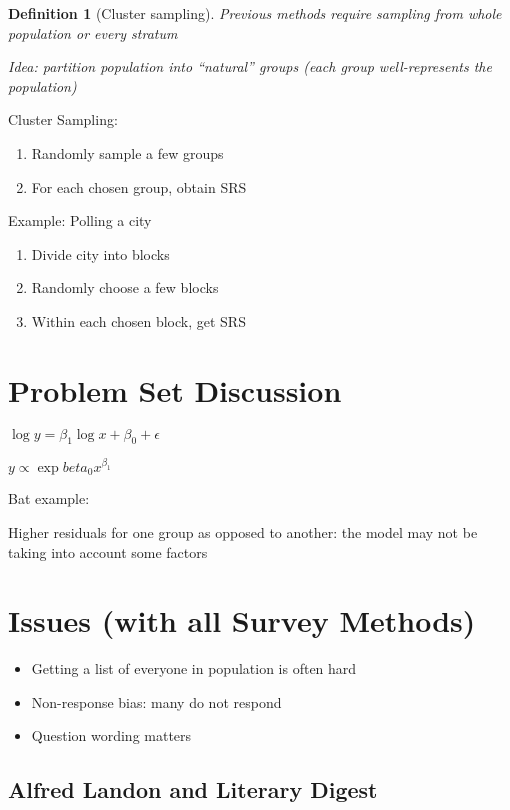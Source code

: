 \documentclass[twoside]{article}
\newtheorem{definition}[theorem]{Definition}
\begin{document}
\begin{definition}[Cluster sampling] 

Previous methods require sampling from whole population or every stratum

Idea: partition population into ``natural'' groups (each group well-represents the population)

\end{definition}

Cluster Sampling:

\begin{enumerate}
\item Randomly sample a few groups
\item For each chosen group, obtain SRS
\end{enumerate}

Example: Polling a city

\begin{enumerate}
\item Divide city into blocks
\item Randomly choose a few blocks
\item Within each chosen block, get SRS
\end{enumerate}

\section{Problem Set Discussion}

$\log{y} = \beta_1 \log{x} + \beta_0 + \epsilon$

$y \propto \exp{beta_0} x^{\beta_1}$

Bat example:

Higher residuals for one group as opposed to another: the model may not be taking into account some factors

\section{Issues (with all Survey Methods)}

\begin{itemize}
\item Getting a list of everyone in population is often hard
\item Non-response bias: many do not respond
\item Question wording matters
\end{itemize}

\subsection{Alfred Landon and Literary Digest}
\end{document}
